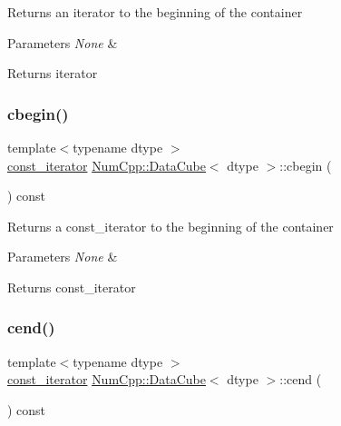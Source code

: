 Returns an iterator to the beginning of the container


\begin{DoxyParams}{Parameters}
{\em None} & \\
\hline
\end{DoxyParams}
\begin{DoxyReturn}{Returns}
iterator 
\end{DoxyReturn}
\mbox{\label{class_num_cpp_1_1_data_cube_a76fa1b7818251391a9a240098557fb68}} 
\subsubsection{\texorpdfstring{cbegin()}{cbegin()}}
{\footnotesize\ttfamily template$<$typename dtype $>$ \\
\mbox{\hyperlink{class_num_cpp_1_1_data_cube_a5916086d9b71149eaa35651e2212de39}{const\+\_\+iterator}} \mbox{\hyperlink{class_num_cpp_1_1_data_cube}{Num\+Cpp\+::\+Data\+Cube}}$<$ dtype $>$\+::cbegin (\begin{DoxyParamCaption}{ }\end{DoxyParamCaption}) const\hspace{0.3cm}{\ttfamily [inline]}}

Returns a const\+\_\+iterator to the beginning of the container


\begin{DoxyParams}{Parameters}
{\em None} & \\
\hline
\end{DoxyParams}
\begin{DoxyReturn}{Returns}
const\+\_\+iterator 
\end{DoxyReturn}
\mbox{\label{class_num_cpp_1_1_data_cube_a882f0475646eb1381969fd6f6ff054cf}} 
\subsubsection{\texorpdfstring{cend()}{cend()}}
{\footnotesize\ttfamily template$<$typename dtype $>$ \\
\mbox{\hyperlink{class_num_cpp_1_1_data_cube_a5916086d9b71149eaa35651e2212de39}{const\+\_\+iterator}} \mbox{\hyperlink{class_num_cpp_1_1_data_cube}{Num\+Cpp\+::\+Data\+Cube}}$<$ dtype $>$\+::cend (\begin{DoxyParamCaption}{ }\end{DoxyParamCaption}) const\hspace{0.3cm}{\ttfamily [inline]}}

